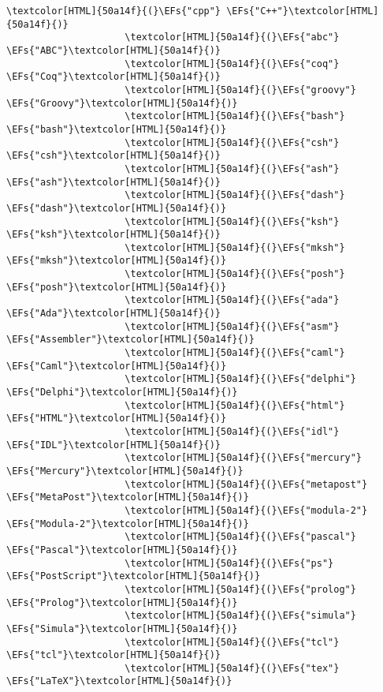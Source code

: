 \documentclass{scrartcl}
\newcommand{\EFs}[1]{\textcolor{EFs}{#1}} %
\begin{document}
\begin{Code}
\begin{Verbatim}[]
                     \textcolor[HTML]{50a14f}{(}\EFs{"cpp"} \EFs{"C++"}\textcolor[HTML]{50a14f}{)}
                     \textcolor[HTML]{50a14f}{(}\EFs{"abc"} \EFs{"ABC"}\textcolor[HTML]{50a14f}{)}
                     \textcolor[HTML]{50a14f}{(}\EFs{"coq"} \EFs{"Coq"}\textcolor[HTML]{50a14f}{)}
                     \textcolor[HTML]{50a14f}{(}\EFs{"groovy"} \EFs{"Groovy"}\textcolor[HTML]{50a14f}{)}
                     \textcolor[HTML]{50a14f}{(}\EFs{"bash"} \EFs{"bash"}\textcolor[HTML]{50a14f}{)}
                     \textcolor[HTML]{50a14f}{(}\EFs{"csh"} \EFs{"csh"}\textcolor[HTML]{50a14f}{)}
                     \textcolor[HTML]{50a14f}{(}\EFs{"ash"} \EFs{"ash"}\textcolor[HTML]{50a14f}{)}
                     \textcolor[HTML]{50a14f}{(}\EFs{"dash"} \EFs{"dash"}\textcolor[HTML]{50a14f}{)}
                     \textcolor[HTML]{50a14f}{(}\EFs{"ksh"} \EFs{"ksh"}\textcolor[HTML]{50a14f}{)}
                     \textcolor[HTML]{50a14f}{(}\EFs{"mksh"} \EFs{"mksh"}\textcolor[HTML]{50a14f}{)}
                     \textcolor[HTML]{50a14f}{(}\EFs{"posh"} \EFs{"posh"}\textcolor[HTML]{50a14f}{)}
                     \textcolor[HTML]{50a14f}{(}\EFs{"ada"} \EFs{"Ada"}\textcolor[HTML]{50a14f}{)}
                     \textcolor[HTML]{50a14f}{(}\EFs{"asm"} \EFs{"Assembler"}\textcolor[HTML]{50a14f}{)}
                     \textcolor[HTML]{50a14f}{(}\EFs{"caml"} \EFs{"Caml"}\textcolor[HTML]{50a14f}{)}
                     \textcolor[HTML]{50a14f}{(}\EFs{"delphi"} \EFs{"Delphi"}\textcolor[HTML]{50a14f}{)}
                     \textcolor[HTML]{50a14f}{(}\EFs{"html"} \EFs{"HTML"}\textcolor[HTML]{50a14f}{)}
                     \textcolor[HTML]{50a14f}{(}\EFs{"idl"} \EFs{"IDL"}\textcolor[HTML]{50a14f}{)}
                     \textcolor[HTML]{50a14f}{(}\EFs{"mercury"} \EFs{"Mercury"}\textcolor[HTML]{50a14f}{)}
                     \textcolor[HTML]{50a14f}{(}\EFs{"metapost"} \EFs{"MetaPost"}\textcolor[HTML]{50a14f}{)}
                     \textcolor[HTML]{50a14f}{(}\EFs{"modula-2"} \EFs{"Modula-2"}\textcolor[HTML]{50a14f}{)}
                     \textcolor[HTML]{50a14f}{(}\EFs{"pascal"} \EFs{"Pascal"}\textcolor[HTML]{50a14f}{)}
                     \textcolor[HTML]{50a14f}{(}\EFs{"ps"} \EFs{"PostScript"}\textcolor[HTML]{50a14f}{)}
                     \textcolor[HTML]{50a14f}{(}\EFs{"prolog"} \EFs{"Prolog"}\textcolor[HTML]{50a14f}{)}
                     \textcolor[HTML]{50a14f}{(}\EFs{"simula"} \EFs{"Simula"}\textcolor[HTML]{50a14f}{)}
                     \textcolor[HTML]{50a14f}{(}\EFs{"tcl"} \EFs{"tcl"}\textcolor[HTML]{50a14f}{)}
                     \textcolor[HTML]{50a14f}{(}\EFs{"tex"} \EFs{"LaTeX"}\textcolor[HTML]{50a14f}{)}

\end{Verbatim}
\end{Code}
\end{document}
